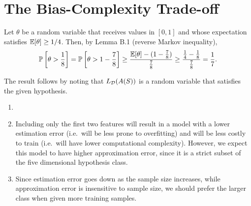 \chapter{The Bias-Complexity Trade-off}

\begin{ex}
  Let $\theta$ be a random variable that receives values in $[0, 1]$ and whose
  expectation satisfies $\mathbb{E}[\theta] \geq 1/4$. Then, by Lemma B.1
  (reverse Markov inequality),
  \begin{align*}
    \mathbb{P}\left[\theta > \frac{1}{8}\right]
    = \mathbb{P}\left[\theta > 1-\frac{7}{8}\right]
    \geq \frac{\mathbb{E}[\theta]-(1-\frac{7}{8})}{\frac{7}{8}}
    \geq \frac{\frac{1}{4}-\frac{1}{8}}{\frac{7}{8}}
    =\frac{1}{7}.
  \end{align*}

  The result follows by noting that $L_{\mathcal{D}}(A(S))$ is a random variable that
  satisfies the given hypothesis.
\end{ex}

\begin{ex}
  \begin{enumerate}
    \item[]
    \item Including only the first two features will result in a model with
          a lower estimation error (i.e.\ will be less prone to overfitting) and
          will be less costly to train (i.e.\ will have lower computational
          complexity). However, we expect this model to have higher
          approximation error, since it is a strict subset of the five
          dimensional hypothesis class.
    \item Since estimation error goes down as the sample size increases, while
          approximation error is insensitive to sample size, we should prefer the
          larger class when given more training samples.
  \end{enumerate}
\end{ex}

\begin{ex}
\end{ex}